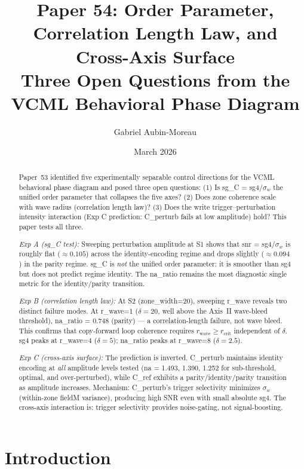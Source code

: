\documentclass[11pt,a4paper]{article}
\title{\textbf{Paper 54: Order Parameter, Correlation Length Law, and Cross-Axis Surface}\\
\large Three Open Questions from the VCML Behavioral Phase Diagram}
\author[1]{Gabriel Aubin-Moreau}
\affil[1]{Independent research}
\date{March 2026}
\begin{document}
\maketitle

\begin{abstract}
Paper~53 identified five experimentally separable control directions for the VCML
behavioral phase diagram and posed three open questions:
(1) Is sg\_C = sg4/$\sigma_w$ the unified order parameter that collapses the five
axes?
(2) Does zone coherence scale with wave radius (correlation length law)?
(3) Does the write trigger--perturbation intensity interaction (Exp C prediction:
C\_perturb fails at low amplitude) hold?
This paper tests all three.

\textit{Exp A (sg\_C test):}
Sweeping perturbation amplitude at S1 shows that snr = sg4/$\sigma_w$ is
roughly flat ($\approx 0.105$) across the identity-encoding regime and drops
slightly ($\approx 0.094$) in the parity regime.
sg\_C is \emph{not} the unified order parameter: it is smoother than sg4 but
does not predict regime identity.
The na\_ratio remains the most diagnostic single metric for the
identity/parity transition.

\textit{Exp B (correlation length law):}
At S2 (zone\_width=20), sweeping r\_wave reveals two distinct failure modes.
At r\_wave=1 ($\delta=20$, well above the Axis~II wave-bleed threshold),
na\_ratio = 0.748 (parity) --- a correlation-length failure, not wave bleed.
This confirms that copy-forward loop coherence requires $r_\text{wave} \geq
r_\text{crit}$ independent of $\delta$.
sg4 peaks at r\_wave=4 ($\delta=5$); na\_ratio peaks at r\_wave=8 ($\delta=2.5$).

\textit{Exp C (cross-axis surface):}
The prediction is inverted.
C\_perturb maintains identity encoding at \emph{all} amplitude levels tested
(na = 1.493, 1.390, 1.252 for sub-threshold, optimal, and over-perturbed),
while C\_ref exhibits a parity/identity/parity transition as amplitude increases.
Mechanism: C\_perturb's trigger selectivity minimizes $\sigma_w$ (within-zone
fieldM variance), producing high SNR even with small absolute sg4.
The cross-axis interaction is: trigger selectivity provides noise-gating, not
signal-boosting.
\end{abstract}

\section{Introduction}
\end{document}
